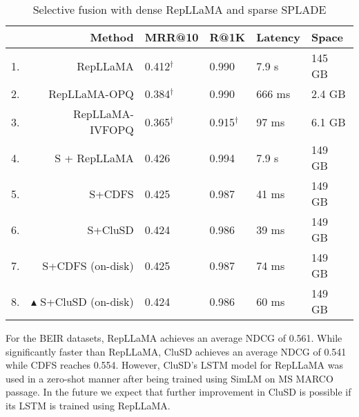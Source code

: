 \begin{table}[htbp]
\vspace*{-1em}
\small
        \centering
        \caption{Selective fusion with  dense RepLLaMA and  sparse SPLADE} 
                \begin{tabular}{r r |l l|l l}
                        \hline\hline 
     &Method    & MRR@10 & R@1K & Latency & Space \\
                        \hline
1.  & RepLLaMA     & 0.412$^\dag$& 	0.990& 	7.9 s& 	145 GB\\
2.   &RepLLaMA-OPQ& 	0.384$^\dag$& 	0.990& 	666 ms& 	2.4 GB \\
3.  & RepLLaMA-IVFOPQ & 	0.365$^\dag$ & 	0.915$^\dag$ & 	97 ms & 	6.1 GB\\
4.   & S + RepLLaMA  & 	0.426& 	0.994& 	7.9 s& 	149 GB\\
5.   & S+CDFS & 0.425	& 0.987& 	41 ms& 	149 GB\\
6.   & S+CluSD & 0.424	& 0.986& 	39 ms& 	149 GB\\
7.   & S+CDFS (on-disk)& 	0.425	& 0.987& 	74 ms& 	149 GB \\
8.   & $\blacktriangle$ S+CluSD (on-disk)& 	0.424	& 0.986& 	60 ms& 	149 GB\\
                \hline\hline
                \end{tabular}  
        
 \vspace*{-5mm}
        \label{tab:RepLLaMA}
\end{table}




For the BEIR datasets,
RepLLaMA achieves an average NDCG of 0.561. 
While significantly faster than RepLLaMA, CluSD achieves an average NDCG of 0.541 while CDFS reaches 0.554.
However, CluSD's LSTM model for RepLLaMA was used in a zero-shot manner after being trained using SimLM on MS MARCO passage.
In the future we expect that further improvement in CluSD is possible if its LSTM is trained using RepLLaMA.

